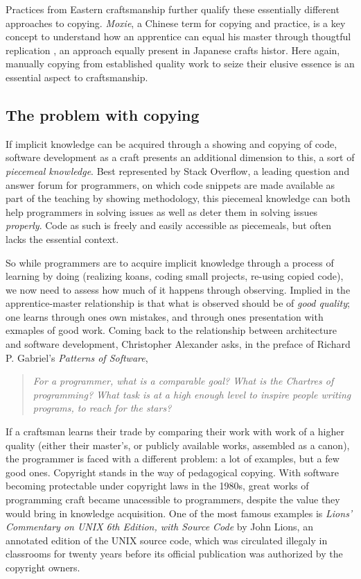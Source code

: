 \documentclass{article}
\begin{document}
Practices from Eastern craftsmanship further qualify these essentially different approaches to copying. \emph{Moxie}, a Chinese term for copying and practice, is a key concept to understand how an apprentice can equal his master through thougtful replication \cite{man_influence_2015}, an approach equally present in Japanese crafts histor\cite{jordan_copying_2003}. Here again, manually copying from established quality work to seize their elusive essence is an essential aspect to craftsmanship.

\subsection{The problem with copying}

If implicit knowledge can be acquired through a showing and copying of code, software development as a craft presents an additional dimension to this, a sort of \emph{piecemeal knowledge}. Best represented by Stack Overflow, a leading question and answer forum for programmers, on which code snippets are made available as part of the teaching by showing methodology, this piecemeal knowledge can both help programmers in solving issues as well as deter them in solving issues \textit{properly}\cite{treude_understanding_2017}. Code as such is freely and easily accessible as piecemeals, but often lacks the essential context.

So while programmers are to acquire implicit knowledge through a process of learning by doing (realizing koans, coding small projects, re-using copied code), we now need to assess how much of it happens through observing. Implied in the apprentice-master relationship is that what is observed should be of \textit{good quality}; one learns through ones own mistakes, and through ones presentation with exmaples of good work. Coming back to the relationship between architecture and software development, Christopher Alexander asks, in the preface of Richard P. Gabriel's \textit{Patterns of Software}\cite{gabriel_patterns_1998},

\begin{quote}
    \textit{For a programmer, what is a comparable goal? What is the Chartres of programming? What task is at a high enough level to inspire people writing programs, to reach for the stars?}
\end{quote}

If a craftsman learns their trade by comparing their work with work of a higher quality (either their master's, or publicly available works, assembled as a canon\cite{taylor_patterns_2001}), the programmer is faced with a different problem: a lot of examples, but a few good ones.  Copyright stands in the way of pedagogical copying. With software becoming protectable under copyright laws in the 1980s\cite{oman_computer_2018}, great works of programming craft became unacessible to programmers, despite the value they would bring in knowledge acquisition\cite{gabriel_mob_2001}. One of the most famous examples is \emph{Lions' Commentary on UNIX 6th Edition, with Source Code} by John Lions, an annotated edition of the UNIX source code, which was circulated illegaly in classrooms for twenty years before its official publication was authorized by the copyright owners\cite{lions_lions_1996}.
\end{document}
